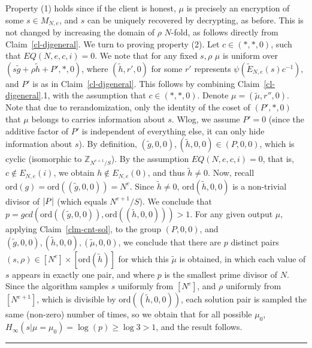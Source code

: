 \documentclass[11pt]{article}
\newenvironment{proof}{\noindent {\bf Proof:} \hspace{.677em}}%
                     {\qed}
\newcommand{\qed}{\hspace*{\fill}\rule{0.6em}{0.6em}}
\newcommand{\encdj}{{E}_{N,e}}
\newcommand{\encdjnr}{{\tilde{E}}_{N,e}}
\newcommand{\Z}{\mathbb{Z}}
\newcommand{\plain}{{{M}}}
\newcommand{\plaintext}[1]{\plain_{#1}}
\newcommand{\mathify}[1]{\ifmmode{#1}\else\mbox{$#1$}\fi}
\newcommand{\size}[1]{\mathify{\left| #1 \right|}}
\newcommand{\order}{{\mathrm{ord}}}
\begin{document}
\begin{proof}
  Property (1) holds since if the client is honest, $\mu$ is precisely
  an encryption of some $s\in\plaintext{N,e}$, and $s$ can be uniquely
  recovered by decrypting, as before. This is not changed by increasing the domain of $\rho$ $N$-fold, as follows directly from Claim~\ref{cl-djgeneral}.
  We turn to proving property (2).
  Let $c\in (*,*,0)$, such that $EQ(N,e,c,i)=0$. We note that for any
  fixed $s,\rho$ $\mu$ is uniform over $(s\tilde{g}+\rho \tilde{h} +
  P',*,0)$, where $(\tilde{h},r',0)$ for some $r'$ represents
  $\psi(\encdjnr(s)c^{-1})$, and $P'$ is as in Claim~\ref{cl-djgeneral}. This follows by combining Claim~\ref{cl-djgeneral}.1, with the
  assumption that $c\in(*,*,0)$. Denote $\mu=(\tilde{\mu},r'',0)$.
  Note that due to rerandomization, only the identity of the coset of $(P',*,0)$ that
  $\mu$ belongs to carries information about $s$. Wlog, we assume
  $P'=0$ (since the additive factor of $P'$ is
  independent of everything else, it can only hide information about
  $s$). By definition, $(\tilde{g},0,0),(\tilde{h},0,0)\in(P,0,0)$, which is cyclic (isomorphic
  to $\Z_{N^{e+1}/S}$).
  By the assumption $EQ(N,e,c,i)=0$, that is, $c\notin\encdj(i)$, we
  obtain $h\notin\encdj(0)$, and thus $\tilde{h}\neq 0$. Now, recall
  $\order(g)=\order((\tilde{g},0,0))=N^e$. Since $\tilde{h}\neq 0$,
  $\order(\tilde{h},0,0)$ is a non-trivial divisor of $\size{P}$
  (which equals $N^{e+1}/S$). We conclude that
  $p=gcd(\order((\tilde{g},0,0)),\order((\tilde{h},0,0)))>1$. For any
  given output $\mu$, applying Claim~\ref{clm-cnt-sol}, to the group
  $(P,0,0)$, and $(\tilde{g},0,0),(\tilde{h},0,0),(\tilde{\mu},0,0)$,
  we conclude that there are $p$ distinct pairs
  $(s,\rho)\in[N^e]\times[\order(\tilde{h})]$ for which this
  $\tilde{\mu}$ is obtained, in which each value of $s$ appears in exactly one
  pair, and where $p$ is the smallest prime divisor of $N$. Since the
  algorithm samples $s$ uniformly from $[N^e]$, and $\rho$ uniformly
  from $[N^{e+1}]$, which is divisible by $\order((\tilde{h},0,0))$,
  each solution pair is sampled the same (non-zero) number of times,
  so we obtain that for all possible $\mu_0$, $H_{\infty}(s|\mu=\mu_0)= \log(p)\geq\log{3}>1$, and the result follows.
\end{proof}
\end{document}
